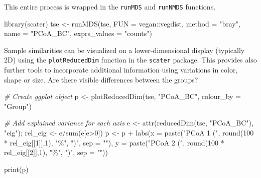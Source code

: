 \documentclass[
]{book}
\newenvironment{Shaded}{\begin{snugshade}}{\end{snugshade}}
\newcommand{\AttributeTok}[1]{\textcolor[rgb]{0.77,0.63,0.00}{#1}}
\newcommand{\CommentTok}[1]{\textcolor[rgb]{0.56,0.35,0.01}{\textit{#1}}}
\newcommand{\DecValTok}[1]{\textcolor[rgb]{0.00,0.00,0.81}{#1}}
\newcommand{\FunctionTok}[1]{\textcolor[rgb]{0.00,0.00,0.00}{#1}}
\newcommand{\NormalTok}[1]{#1}
\newcommand{\OtherTok}[1]{\textcolor[rgb]{0.56,0.35,0.01}{#1}}
\newcommand{\SpecialCharTok}[1]{\textcolor[rgb]{0.00,0.00,0.00}{#1}}
\newcommand{\StringTok}[1]{\textcolor[rgb]{0.31,0.60,0.02}{#1}}
\begin{document}
This entire process is wrapped in the \texttt{runMDS} and \texttt{runNMDS}
functions.

\begin{Shaded}
\begin{Highlighting}[]
\FunctionTok{library}\NormalTok{(scater)}
\NormalTok{tse }\OtherTok{\textless{}{-}} \FunctionTok{runMDS}\NormalTok{(tse, }\AttributeTok{FUN =}\NormalTok{ vegan}\SpecialCharTok{::}\NormalTok{vegdist, }\AttributeTok{method =} \StringTok{"bray"}\NormalTok{, }\AttributeTok{name =} \StringTok{"PCoA\_BC"}\NormalTok{, }\AttributeTok{exprs\_values =} \StringTok{"counts"}\NormalTok{)}
\end{Highlighting}
\end{Shaded}

Sample similarities can be visualized on a lower-dimensional display
(typically 2D) using the \texttt{plotReducedDim} function in the \texttt{scater}
package. This provides also further tools to incorporate additional
information using variations in color, shape or size. Are there
visible differences between the groups?

\begin{Shaded}
\begin{Highlighting}[]
\CommentTok{\# Create ggplot object}
\NormalTok{p }\OtherTok{\textless{}{-}} \FunctionTok{plotReducedDim}\NormalTok{(tse, }\StringTok{"PCoA\_BC"}\NormalTok{, }\AttributeTok{colour\_by =} \StringTok{"Group"}\NormalTok{)}

\CommentTok{\# Add explained variance for each axis}
\NormalTok{e }\OtherTok{\textless{}{-}} \FunctionTok{attr}\NormalTok{(}\FunctionTok{reducedDim}\NormalTok{(tse, }\StringTok{"PCoA\_BC"}\NormalTok{), }\StringTok{"eig"}\NormalTok{);}
\NormalTok{rel\_eig }\OtherTok{\textless{}{-}}\NormalTok{ e}\SpecialCharTok{/}\FunctionTok{sum}\NormalTok{(e[e}\SpecialCharTok{\textgreater{}}\DecValTok{0}\NormalTok{])          }
\NormalTok{p }\OtherTok{\textless{}{-}}\NormalTok{ p }\SpecialCharTok{+} \FunctionTok{labs}\NormalTok{(}\AttributeTok{x =} \FunctionTok{paste}\NormalTok{(}\StringTok{"PCoA 1 ("}\NormalTok{, }\FunctionTok{round}\NormalTok{(}\DecValTok{100} \SpecialCharTok{*}\NormalTok{ rel\_eig[[}\DecValTok{1}\NormalTok{]],}\DecValTok{1}\NormalTok{), }\StringTok{"\%"}\NormalTok{, }\StringTok{")"}\NormalTok{, }\AttributeTok{sep =} \StringTok{""}\NormalTok{),}
              \AttributeTok{y =} \FunctionTok{paste}\NormalTok{(}\StringTok{"PCoA 2 ("}\NormalTok{, }\FunctionTok{round}\NormalTok{(}\DecValTok{100} \SpecialCharTok{*}\NormalTok{ rel\_eig[[}\DecValTok{2}\NormalTok{]],}\DecValTok{1}\NormalTok{), }\StringTok{"\%"}\NormalTok{, }\StringTok{")"}\NormalTok{, }\AttributeTok{sep =} \StringTok{""}\NormalTok{))}

\FunctionTok{print}\NormalTok{(p)}
\end{Highlighting}
\end{Shaded}
\end{document}
